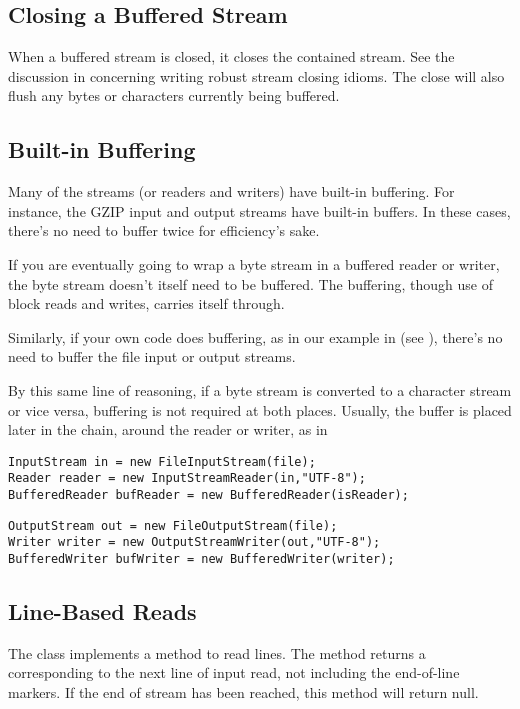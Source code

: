 \subsection{Closing a Buffered Stream}

When a buffered stream is closed, it closes the contained stream.  See
the discussion in  concerning writing
robust stream closing idioms.  The close will also flush any bytes
or characters currently being buffered.

\subsection{Built-in Buffering}

Many of the streams (or readers and writers) have built-in buffering.
For instance, the GZIP input and output streams have built-in buffers.
In these cases, there's no need to buffer twice for efficiency's sake.

If you are eventually going to wrap a byte stream in a buffered
reader or writer, the byte stream doesn't itself need to be buffered.
The buffering, though use of block reads and writes, carries itself through.

Similarly, if your own code does buffering, as in our example in
 (see ), there's no need to buffer
the file input or output streams.

By this same line of reasoning, if a byte stream is converted to a
character stream or vice versa, buffering is not required at both
places.  Usually, the buffer is placed later in the chain, around the
reader or writer, as in
%
\begin{verbatim}
InputStream in = new FileInputStream(file);
Reader reader = new InputStreamReader(in,"UTF-8");
BufferedReader bufReader = new BufferedReader(isReader);
\end{verbatim}
%
\begin{verbatim}
OutputStream out = new FileOutputStream(file);
Writer writer = new OutputStreamWriter(out,"UTF-8");
BufferedWriter bufWriter = new BufferedWriter(writer);
\end{verbatim}

\subsection{Line-Based Reads}

The  class implements a method to read lines.
The method  returns a  corresponding to
the next line of input read, not including the end-of-line markers.
If the end of stream has been reached, this method will return null.

